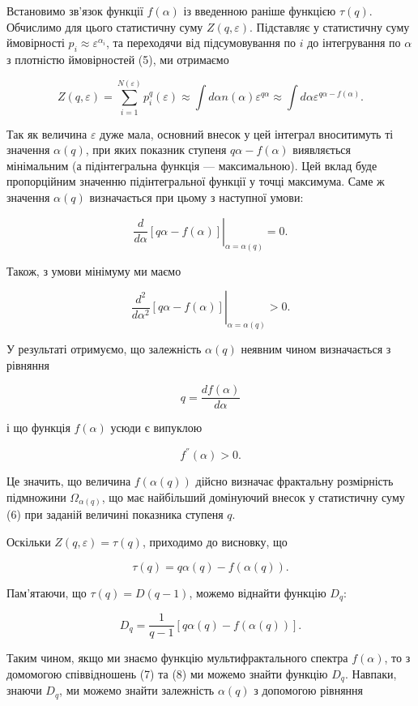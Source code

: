 \documentclass[
  letterpaper,
]{report}
\begin{document}
Встановимо зв'язок функції \(f(\alpha)\) із введенною раніше функцією
\(\tau(q)\). Обчислимо для цього статистичну суму \(Z(q,\varepsilon)\).
Підставляє у статистичну суму ймовірності
\(p_i \approx \varepsilon^{\alpha_i}\), та переходячи від підсумовування
по \(i\) до інтегрування по \(\alpha\) з плотністю ймовірностей (5), ми
отримаємо

\[\tag{6}
Z(q,\varepsilon) = \sum_{i=1}^{N(\varepsilon)} p_{i}^{q}(\varepsilon) \approx \int d\alpha n(\alpha)\varepsilon^{q\alpha} \approx \int d\alpha\varepsilon^{q\alpha-f(\alpha)}. 
\]

Так як величина \(\varepsilon\) дуже мала, основний внесок у цей
інтеграл вноситимуть ті значення \(\alpha(q)\), при яких показник
ступеня \(q\alpha-f(\alpha)\) виявляється мінімальним (а підінтегральна
функція --- максимальною). Цей вклад буде пропорційним значенню
підінтегральної функції у точці максимума. Саме ж значення \(\alpha(q)\)
визначається при цьому з наступної умови:

\[
\left. \frac{d}{d\alpha}[ q\alpha-f(\alpha) ] \right \vert_{\alpha=\alpha(q)} = 0. 
\]

Також, з умови мінімуму ми маємо

\[
\left. \frac{d^{2}}{d\alpha^{2}}[ q\alpha-f(\alpha) ] \right \vert_{\alpha=\alpha(q)} > 0. 
\]

У результаті отримуємо, що залежність \(\alpha(q)\) неявним чином
визначається з рівняння

\[\tag{7}
q = \frac{df(\alpha)}{d\alpha}
\]

і що функція \(f(\alpha)\) усюди є випуклою

\[
f^{''}(\alpha)>0.
\]

Це значить, що величина \(f(\alpha(q))\) дійсно визначає фрактальну
розмірність підмножини \(\Omega_{\alpha(q)}\), що має найбільший
домінуючий внесок у статистичну суму (6) при заданій величині показника
ступеня \(q\).

Оскільки \(Z(q,\varepsilon)=\tau(q)\), приходимо до висновку, що

\[
\tau(q) = q\alpha(q) - f(\alpha(q)). 
\]

Пам'ятаючи, що \(\tau(q)=D(q-1)\), можемо віднайти функцію \(D_{q}\):

\[\tag{8}
D_{q} = \frac{1}{q-1}[ q\alpha(q)-f(\alpha(q)) ]. 
\]

Таким чином, якщо ми знаємо функцію мультифрактального спектра
\(f(\alpha)\), то з домомогою співвідношень (7) та (8) ми можемо знайти
функцію \(D_{q}\). Навпаки, знаючи \(D_{q}\), ми можемо знайти
залежність \(\alpha(q)\) з допомогою рівняння
\end{document}
